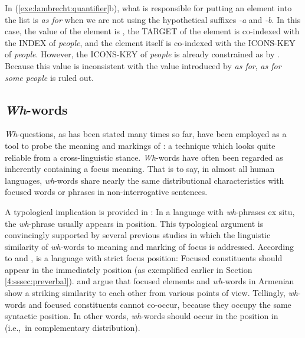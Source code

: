 \noindent In (\ref{exe:lambrecht:quantifier}b), what is responsible
for putting an  element into the  list is
\textit{as for} when we are not using the hypothetical suffixes \textit{-a}
and \textit{-b}. In this case, the  value of the element is
, the TARGET of the element is co-indexed with the INDEX of
\textit{people}, and the element itself is co-indexed with the
ICONS-KEY of \textit{people}. However, the ICONS-KEY of
\textit{people} is already constrained as  by
. Because this value is inconsistent with the
 value introduced by \textit{as for}, \textit{as for some
  people} is ruled out.


\subsection{\textit{Wh}-words}
\label{10:sssec:wh}


\textit{Wh}-questions, as has been stated
many times so far, have been employed as a tool to probe the meaning
and markings of : a technique which looks quite reliable
from a cross-linguistic stance.  \textit{Wh}-words have often been
regarded as inherently containing a focus meaning. That is to say, in
almost all human languages, \textit{wh}-words share nearly the same
distributional characteristics with focused words or phrases in
non-interrogative sentences.




A typological implication is provided in \citet[5]{drubig:03}: In a
language with \textit{wh}-phrases ex situ, the
\textit{wh}-phrase usually appears in  position. This
typological argument is convincingly supported by several previous
studies in which the linguistic similarity of \textit{wh}-words to
meaning and marking of focus is addressed.  According to
\citet{comrie:84} and \citet{buring:10},  is a language
with strict focus position: Focused constituents should appear in the
immediately  position (as exemplified earlier in
Section \ref{4:sssec:preverbal}).  \citet{tamrazian:91} and
\citet{megerdoomian:11} argue that focused elements and
\textit{wh}-words in Armenian show a striking similarity to each other
from various points of view. Tellingly,
\textit{wh}-words and focused constituents cannot co-occur, because
they occupy the same syntactic position. In
other words, \textit{wh}-words should occur in the 
position in  (i.e.,\ in complementary distribution).



